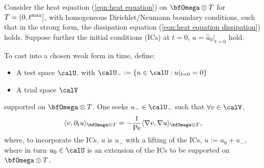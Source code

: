     \begin{example}
        Consider the heat equation (\ref{eqn:heat equation}) on $\bfOmega\otimes T$ for $T  =  \left(0, t^{\rm max}\right]$, with homogeneous Dirichlet/Neumann boundary conditions, such that in the strong form, the dissipation equation (\ref{eqn:heat equation dissipation}) holds. Suppose further the initial conditions (ICs) at $t  =  0$, $u  =  \widehat{u}_{0}|_{t = 0}$ hold.
        
        To cast into a chosen weak form in time, define:
        \begin{itemize}
            \item  A test space $\calU$, with $\calU_{-}  :=  \{u  \in  \calU  : 
         u|_{t = 0}  =  0\}$
            \item  A trial space $\calV$
        \end{itemize}
        supported on $\bfOmega\otimes T$. One seeks $u_{-}  \in  \calU_{-}$ such that $\forall  v  \in  \calV$,
        \begin{equation}\label{eqn:heat equation weak form}
            \langle v, \partial_{t}u\rangle_{\bfOmega\otimes T}  =   - \frac{1}{\rmPe}\langle\nabla v, \nabla u\rangle_{\bfOmega\otimes T},
        \end{equation}
        where, to incorporate the ICs, $u$ is $u_{-}$ with a lifting of the ICs, $u  :=  u_{0} + u_{-}$, where in turn $u_{0}  \in  \calU$ is an extension of the ICs to be supported on $\bfOmega\otimes T$.
        

\end{example}
